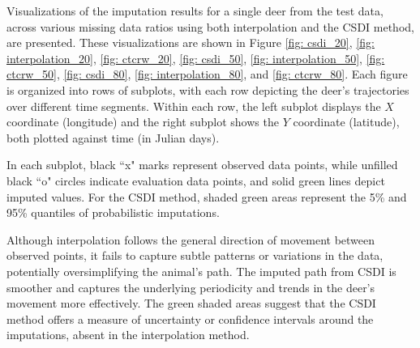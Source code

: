 \documentclass[11pt]{article}
\begin{document}
Visualizations of the imputation results for a single deer from the test data, across various missing data ratios using both interpolation and the CSDI method, are presented. These visualizations are shown in Figure \ref{fig: csdi_20}, \ref{fig: interpolation_20}, \ref{fig: ctcrw_20}, \ref{fig: csdi_50}, \ref{fig: interpolation_50}, \ref{fig: ctcrw_50}, \ref{fig: csdi_80}, \ref{fig: interpolation_80}, and \ref{fig: ctcrw_80}. Each figure is organized into rows of subplots, with each row depicting the deer's trajectories over different time segments. Within each row, the left subplot displays the $X$ coordinate (longitude) and the right subplot shows the $Y$ coordinate (latitude), both plotted against time (in Julian days).

In each subplot, black ``x" marks represent observed data points, while unfilled black ``o" circles indicate evaluation data points, and solid green lines depict imputed values. For the CSDI method, shaded green areas represent the 5\% and 95\% quantiles of probabilistic imputations.

Although interpolation follows the general direction of movement between observed points, it fails to capture subtle patterns or variations in the data, potentially oversimplifying the animal's path. The imputed path from CSDI is smoother and captures the underlying periodicity and trends in the deer's movement more effectively. The green shaded areas suggest that the CSDI method offers a measure of uncertainty or confidence intervals around the imputations, absent in the interpolation method.
\end{document}

